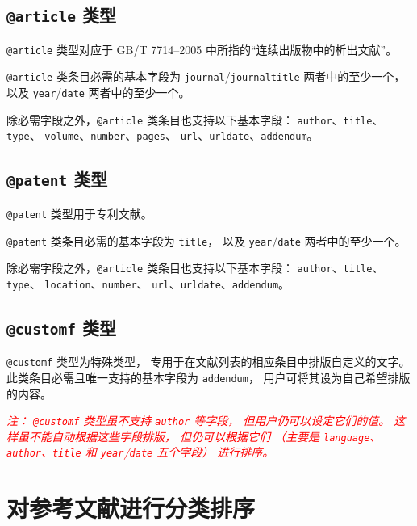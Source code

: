 \documentclass[UTF8]{ctexart}
\newcommand{\myemph}[1]{\emph{\textcolor{red}{#1}}}
\begin{document}
\subsection{\texttt{@article} 类型}

\verb|@article| 类型对应于 GB/T 7714--2005 中所指的“连续出版物中的析出文献”。

\verb|@article| 类条目必需的基本字段为
\verb|journal|/\verb|journaltitle| 两者中的至少一个，
以及 \verb|year|/\verb|date| 两者中的至少一个。

除必需字段之外，\verb|@article| 类条目也支持以下基本字段：%
\verb|author|、\verb|title|、\verb|type|、%
\verb|volume|、\verb|number|、\verb|pages|、%
\verb|url|、\verb|urldate|、\verb|addendum|。

\subsection{\texttt{@patent} 类型}

\verb|@patent| 类型用于专利文献。

\verb|@patent| 类条目必需的基本字段为 \verb|title|，
以及 \verb|year|/\verb|date| 两者中的至少一个。

除必需字段之外，\verb|@article| 类条目也支持以下基本字段：%
\verb|author|、\verb|title|、\verb|type|、%
\verb|location|、\verb|number|、%
\verb|url|、\verb|urldate|、\verb|addendum|。

\subsection{\texttt{@customf} 类型}

\verb|@customf| 类型为特殊类型，
专用于在文献列表的相应条目中排版自定义的文字。
此类条目必需且唯一支持的基本字段为 \verb|addendum|，
用户可将其设为自己希望排版的内容。

\myemph{%
	注：%
	\texttt{@customf} 类型虽不支持 \texttt{author} 等字段，
	但用户仍可以设定它们的值。
	这样虽不能自动根据这些字段排版，
	但仍可以根据它们
	（主要是 \texttt{language}、\texttt{author}、\texttt{title}
	和 \texttt{year}/\texttt{date} 五个字段）
	进行排序。 %
}

\section{对参考文献进行分类排序}\label{sec:catsort}
\end{document}
